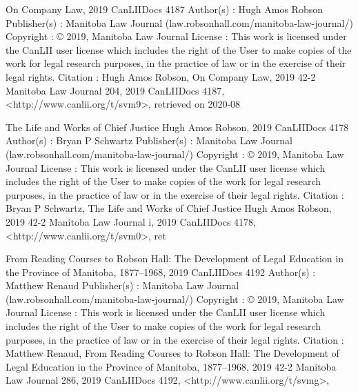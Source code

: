 On Company Law, 2019 CanLIIDocs 4187
Author(s) : 	Hugh Amos Robson
Publisher(s) : 	Manitoba Law Journal (law.robsonhall.com/manitoba-law-journal/)
Copyright : 	© 2019, Manitoba Law Journal
License : 	This work is licensed under the CanLII user license which includes the right of the User to make copies of the work for legal research purposes, in the practice of law or in the exercise of their legal rights.
Citation : 	Hugh Amos Robson, On Company Law, 2019 42-2 Manitoba Law Journal 204, 2019 CanLIIDocs 4187, <http://www.canlii.org/t/svm9>, retrieved on 2020-08


The Life and Works of Chief Justice Hugh Amos Robson, 2019 CanLIIDocs 4178
Author(s) : 	Bryan P Schwartz
Publisher(s) : 	Manitoba Law Journal (law.robsonhall.com/manitoba-law-journal/)
Copyright : 	© 2019, Manitoba Law Journal
License : 	This work is licensed under the CanLII user license which includes the right of the User to make copies of the work for legal research purposes, in the practice of law or in the exercise of their legal rights.
Citation : 	Bryan P Schwartz, The Life and Works of Chief Justice Hugh Amos Robson, 2019 42-2 Manitoba Law Journal i, 2019 CanLIIDocs 4178, <http://www.canlii.org/t/svm0>, ret


From Reading Courses to Robson Hall: The Development of Legal Education in the Province of Manitoba, 1877–1968, 2019 CanLIIDocs 4192
Author(s) : 	Matthew Renaud
Publisher(s) : 	Manitoba Law Journal (law.robsonhall.com/manitoba-law-journal/)
Copyright : 	© 2019, Manitoba Law Journal
License : 	This work is licensed under the CanLII user license which includes the right of the User to make copies of the work for legal research purposes, in the practice of law or in the exercise of their legal rights.
Citation : 	Matthew Renaud, From Reading Courses to Robson Hall: The Development of Legal Education in the Province of Manitoba, 1877–1968, 2019 42-2 Manitoba Law Journal 286, 2019 CanLIIDocs 4192, <http://www.canlii.org/t/svmg>,


